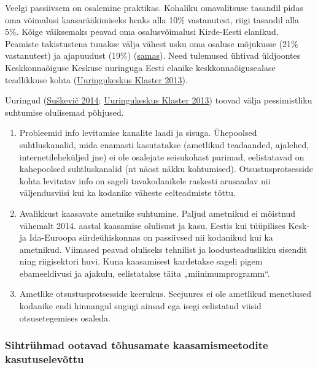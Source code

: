 \documentclass[estonian,]{article}
\begin{document}
Veelgi passiivsem on osalemine praktikas. Kohaliku omavalitsuse tasandil pidas oma võimalusi kaasarääkimiseks heaks alla 10\% vastanutest, riigi tasandil alla 5\%. Kõige väiksemaks peavad oma osalusvõimalusi Kirde-Eesti elanikud. Peamiste takistustena tuuakse välja vähest usku oma osaluse mõjukusse (21\% vastanutest) ja ajapuudust (19\%) (\protect\hyperlink{Turu-uuringute2018}{samas}). Need tulemused ühtivad üldjoontes Keskkonnaõiguse Keskuse uuringuga Eesti elanike keskkonnaõigusealase teadlikkuse kohta (\protect\hyperlink{Uuringukeskus2013}{Uuringukeskus Klaster 2013}).

Uuringud (\protect\hyperlink{Suux161keviux10d2014}{Suškevič 2014}; \protect\hyperlink{Uuringukeskus2013}{Uuringukeskus Klaster 2013}) toovad välja pessimistliku suhtumise olulisemad põhjused.

\begin{enumerate}
\def\labelenumi{\arabic{enumi}.}
\item
  Probleemid info levitamise kanalite laadi ja sisuga. Ühepoolsed suhtluskanalid, mida enamasti kasutatakse (ametlikud teadaanded, ajalehed, internetileheküljed jne) ei ole osalejate seisukohast parimad, eelistatavad on kahepoolsed suhtluskanalid (nt näost näkku kohtumised). Otsustusprotsesside kohta levitatav info on sageli tavakodanikele raskesti arusaadav nii väljendusviisi kui ka kodanike väheste eelteadmiste tõttu.
\item
  Avalikkust kaasavate ametnike suhtumine. Paljud ametnikud ei mõistnud vähemalt 2014. aastal kaasamise olulisust ja kasu. Eestis kui tüüpilises Kesk- ja Ida-Euroopa siirdeühiskonnas on passiivsed nii kodanikud kui ka ametnikud. Viimased peavad oluliseks tehnilist ja loodusteaduslikku sisendit ning riigisektori huvi. Kuna kaasamisest kardetakse sageli pigem ebameeldivusi ja ajakulu, eelistatakse täita „miinimumprogramm``.
\item
  Ametlike otsustusprotsesside keerukus. Seejuures ei ole ametlikud menetlused kodanike endi hinnangul sugugi ainsad ega isegi eelistatud viisid otsusetegemises osaleda.
\end{enumerate}

\hypertarget{sihtruxfchmad-ootavad-tuxf5husamate-kaasamismeetodite-kasutuselevuxf5ttu}{%
\subsubsection*{Sihtrühmad ootavad tõhusamate kaasamismeetodite kasutuselevõttu}\label{sihtruxfchmad-ootavad-tuxf5husamate-kaasamismeetodite-kasutuselevuxf5ttu}}
\end{document}
